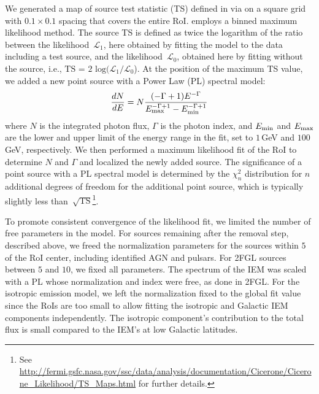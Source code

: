We generated a map of source test statistic (TS) defined in \citet{Mattox96-Likelihood} via \ptlike{} on a square grid with $0.1$\degr{}\,$\times$\,$0.1$\degr{} spacing that covers the entire RoI. \ptlike{} employs a binned maximum likelihood method. The source TS is defined as twice the logarithm of the ratio between the likelihood~$\mathcal{L}_1$, here obtained by fitting the model to the data including a test source, and the likelihood~$\mathcal{L}_0$, obtained here by fitting without the source, i.e., $\textrm{TS = 2 log}(\mathcal{L}_1/\mathcal{L}_0$). At the position of the maximum TS value, we added a new point source with a Power Law (PL) spectral model:
\begin{equation}
	\label{eqn:PL}
	\frac{dN}{dE} = N\frac{(-\Gamma+1)E^{-\Gamma}} {E_{\rm max}^{-\Gamma+1} - E_{\rm min}^{-\Gamma+1}}
\end{equation}
where $N$ is the integrated photon flux, $\Gamma$ is the photon index, and $E_{\rm min}$ and $E_{\rm max}$ are the lower and upper limit of the energy range in the fit, set to $1$\,GeV and $100$\,GeV, respectively.
We then performed a maximum likelihood fit of the RoI to determine $N$ and $\Gamma$ and localized the newly added source. 
The significance of a point source with a PL spectral model is determined by the $\chi^2_n$ distribution for $n$ additional degrees of freedom for the additional point source, which is typically slightly less than~$\sqrt{\textrm{TS}}$\footnote{See \url{http://fermi.gsfc.nasa.gov/ssc/data/analysis/documentation/Cicerone/Cicerone_Likelihood/TS_Maps.html} for further details.}.

To promote consistent convergence of the likelihood fit, we limited the number of free parameters in the model. For sources remaining after the removal step, described above, we freed the normalization parameters for the sources within $5$\degr{} of the RoI center, including identified AGN and pulsars. For 2FGL sources between $5$\degr{} and $10$\degr{}, we fixed all parameters. The spectrum of the IEM was scaled with a PL whose normalization and index were free, as done in 2FGL.
For the isotropic emission model, we left the normalization fixed to the global fit value since the RoIs are too small to allow fitting %
the isotropic and Galactic IEM components independently. The isotropic component's contribution to the total flux is small compared to the IEM's at low Galactic latitudes.

